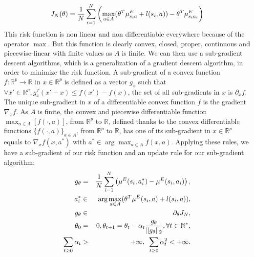 \documentclass{article}
\begin{document}
\begin{equation}
\label{structure.eqn}
J_N(\theta)  = {1\over N} \sum_{i=1}^N\left(\max_{a\in A}(\theta ^T \mu^E_{s_ia} + l(s_i,a)) - \theta ^T \mu^E_{s_ia_i} \right)
\end{equation}
This risk function is non linear and non differentiable everywhere because of the operator $\max$. But this function is clearly convex, closed, proper, continuous and piecewise-linear with finite values as $A$ is finite. We can then use a sub-gradient descent algorithms, which is a generalization of a gradient descent algorithm, in order to minimize the risk function. A sub-gradient of a convex function  $f:\mathbb{R}^p\rightarrow \mathbb{R}$ in $x\in\mathbb{R}^p$ is defined as a vector $g_x$ such that $\forall x' \in \mathbb{R}^p, g_x^T(x'-x)\leq f(x')-f(x)$, the set of all sub-gradients in $x$ is $\partial_xf$. The unique sub-gradient in $x$ of a differentiable convex function $f$ is the gradient $\nabla_xf$. As $A$ is finite, the convex and piecewise differentiable function $\max_{a\in A}[f(\cdot,a)]$, from $\mathbb{R}^p$ to $\mathbb{R}$, defined thanks to the convex differentiable functions $\{f(\cdot,a)\}_{a\in A}$, from $\mathbb{R}^p$ to $\mathbb{R}$,  has one of its sub-gradient in $x\in\mathbb{R}^p$ equals to $\nabla_xf(x,a^*)$ with $a^*\in\arg\max_{a\in A}f(x,a)$. Applying these rules, we have a sub-gradient of our risk function and an update rule for our sub-gradient algorithm:
\begin{eqnarray}
\label{algorithm}
g_{\theta} &=& {1\over N}\sum\limits_{i=1}^N\left(\mu^E(s_i,a^*_i) - \mu^E(s_i,a_i)\right),\\
a^*_i &\in& \arg\max_{a\in A}(\theta ^T \mu^E(s_i,a) + l(s_i,a)),\\
g_{\theta} &\in& \partial_\theta J_N,\\
\theta_{0}&=&0,\theta_{t+1}=\theta_t -\alpha_t\frac{g_{\theta}}{\|g_{\theta}\|_2},\forall t\in\mathbb{N}^*,\\
\sum_{t\geq0}\alpha_t&>&+\infty,\text{ }\sum_{t\geq0}\alpha_t^2<+\infty.
\end{eqnarray}
\end{document}
